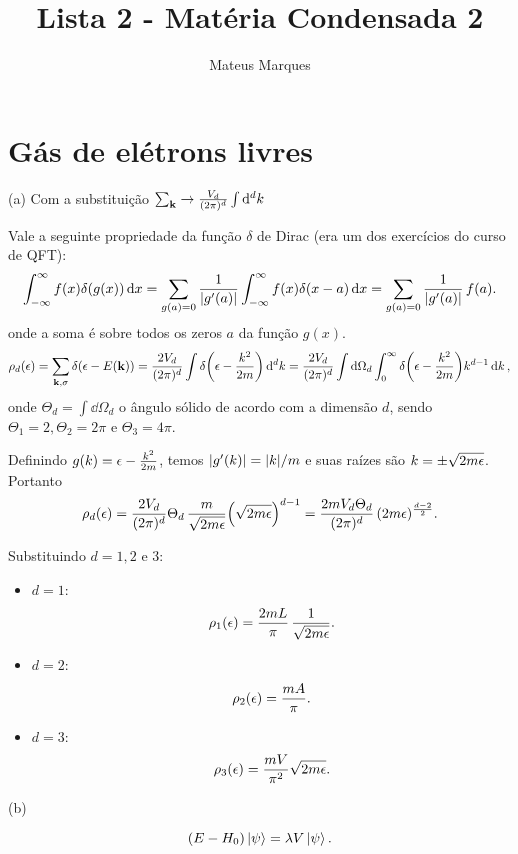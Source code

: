 \documentclass[a4paper,10pt]{article}
\title{\Huge{\textbf{Lista 2 - Matéria Condensada 2}}}
\author{Mateus Marques}
\begin{document}
\maketitle


\section{Gás de elétrons livres}

(a) Com a substituição $\sum_{\vb{k}} \to \frac{V_d}{(2\pi)^d} \int \dd[d]{k}$

Vale a seguinte propriedade da função $\delta$ de Dirac (era um dos exercícios do curso de QFT):
$$
\int_{-\infty}^{\infty} f(x) \delta(g(x)) \dd{x} =
\sum_{g(a)=0} \frac{1}{\abs{g'(a)}} \int_{-\infty}^{\infty} f(x) \delta(x-a) \dd{x}=
\sum_{g(a)=0} \frac{1}{\abs{g'(a)}} \, f(a).
$$
onde a soma é sobre todos os zeros $a$ da função $g(x)$.
$$
\rho_d(\epsilon) = \sum_{\vb{k}, \sigma} \delta(\epsilon - E(\vb{k})) =
\frac{2V_d}{(2\pi)^d} \int \delta\qty(\epsilon - \frac{k^2}{2m}) \dd[d]{k} =
\frac{2V_d}{(2\pi)^d} \int \dd{\Omega_d} \int_0^\infty \delta\qty(\epsilon - \frac{k^2}{2m}) k^{d-1} \dd{k},
$$
onde $\Theta_d = \int \dd{\Omega_d}$ o ângulo sólido de acordo com a dimensão $d$, sendo $\Theta_1 = 2, \Theta_2 = 2\pi$ e $\Theta_3 = 4\pi$.

Definindo $g(k) = \epsilon - \frac{k^2}{2m}$, temos $\abs{g'(k)} = \abs{k} / m$ e suas raízes são $k = \pm \sqrt{2m \epsilon}$. Portanto
$$
\rho_d(\epsilon) = \frac{2V_d}{(2\pi)^d} \Theta_d \, \frac{m}{\sqrt{2m\epsilon}}
\qty(\sqrt{2m \epsilon})^{d-1} = \frac{2 m V_d \Theta_d}{(2\pi)^d} \, (2m\epsilon)^{\frac{d-2}{2}}.
$$

Substituindo $d = 1, 2$ e $3$:
\begin{itemize}
\item $d = 1$:
$$
\rho_1(\epsilon) = \frac{2 m L}{\pi} \, \frac{1}{\sqrt{2m\epsilon}}.
$$
\item $d = 2$:
$$
\rho_2(\epsilon) = \frac{m A}{\pi}.
$$
\item $d = 3$:
$$
\rho_3(\epsilon) = \frac{m V}{\pi^2} \sqrt{2m\epsilon}.
$$
\end{itemize}

(b)

\begin{equation} \label{eq:pertub}
(E - H_0) \ket{\psi} = \lambda V \ket{\psi}.
\end{equation}
\end{document}

